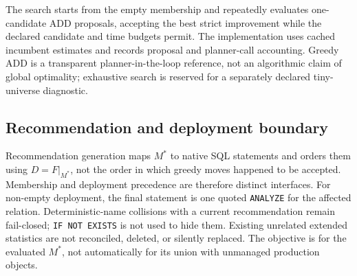 The search starts from the empty membership and repeatedly evaluates
one-candidate ADD proposals, accepting the best strict improvement while the
declared candidate and time budgets permit. The implementation uses cached
incumbent estimates and records proposal and planner-call accounting. Greedy
ADD is a transparent planner-in-the-loop reference, not an algorithmic claim
of global optimality; exhaustive search is reserved for a separately declared
tiny-universe diagnostic.

\subsection{Recommendation and deployment boundary}

Recommendation generation maps $M^*$ to native SQL statements and orders them
using $D=F|_{M^*}$, not the order in which greedy moves happened to be
accepted. Membership and deployment precedence are therefore distinct
interfaces. For non-empty deployment, the final statement is one quoted
\texttt{ANALYZE} for the affected relation. Deterministic-name collisions
with a current recommendation remain fail-closed; \texttt{IF NOT EXISTS} is
not used to hide them. Existing unrelated extended statistics are not
reconciled, deleted, or silently replaced. The objective is for the evaluated
$M^*$, not automatically for its union with unmanaged production objects.
